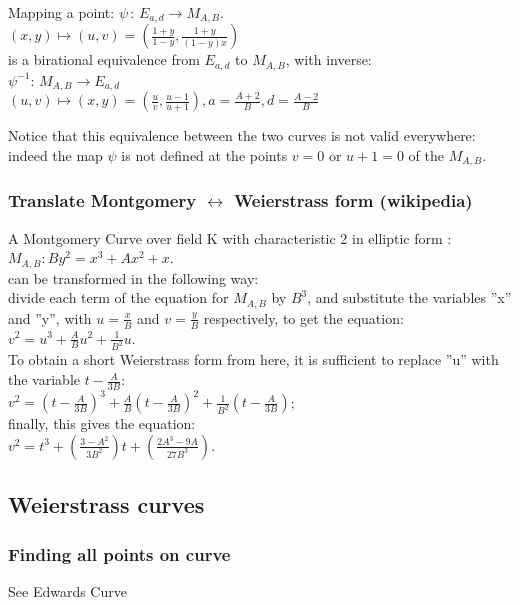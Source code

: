 \documentclass{article}
\begin{document}
Mapping a point: $\psi\,:\,E_{a,d} \rightarrow M_{A,B}$.\\ 
$(x,y) \mapsto (u,v) = \left(\frac{1+y}{1-y},\frac{1+y}{(1-y)x}\right)$ \\

is a birational equivalence from $E_{a,d}$ to $M_{A,B}$, with inverse:\\
$\psi^{-1}$: $M_{A,B} \rightarrow E_{a,d}$ \\
$(u,v) \mapsto (x,y) = \left(\frac{u}{v},\frac{u-1}{u+1}\right),
a=\frac{A+2}{B}, d=\frac{A-2}{B}$

Notice that this equivalence between the two curves is not valid everywhere: indeed the map $\psi$ is not defined at the points $v = 0$ or $u + 1 = 0$ of the $M_{A,B}$.

\subsubsection{Translate Montgomery $\leftrightarrow$ Weierstrass form (wikipedia)}
A Montgomery Curve over field K with characteristic 2 in elliptic form : $M_{A,B}: By^2 = x^3 + Ax^2 + x$.\\
can be transformed in the following way:\\
divide each term of the equation for $M_{A,B}$ by $B^3$, and substitute the variables ''x'' and ''y'', with $u=\frac{x}{B}$ and $v=\frac{y}{B}$ respectively, to get the equation:\\

$v^2 = u^3 + \frac{A}{B}u^2 + \frac{1}{B^2}u$.\\

To obtain a short Weierstrass form from here, it is sufficient to replace ''u'' with the variable $t-\frac{A}{3B}$:\\

$v^2 = \left(t-\frac{A}{3B}\right)^3 + \frac{A}{B}\left(t-\frac{A}{3B}\right)^2 + \frac{1}{B^2}\left(t-\frac{A}{3B}\right)$;\\

finally, this gives the equation:\\

$v^2 = t^3 + \left(\frac{3-A^2}{3B^2}\right)t + \left(\frac{2A^3-9A}{27B^3}\right)$.


\subsection{Weierstrass curves}
\subsubsection{Finding all points on curve}
See Edwards Curve
\end{document}
